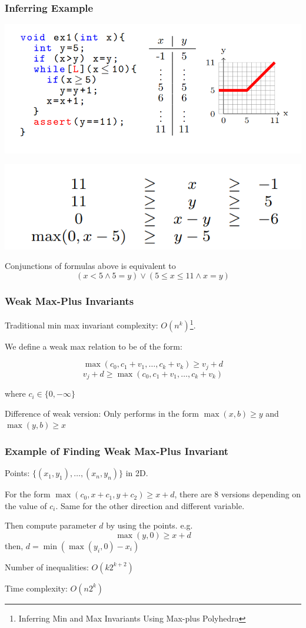 \documentclass[11pt]{beamer}
\begin{document}
\begin{frame}\frametitle{Inferring Example}
\includegraphics[scale=0.24]{1.png}
\begin{center}
\includegraphics[scale=0.34]{4.png}
\end{center}
Conjunctions of formulas above is equivalent to 
\[(x < 5 \wedge 5 = y) \vee (5 \le x \le 11 \wedge x = y)\]
\end{frame}


\begin{frame}\frametitle{Weak Max-Plus Invariants}
Traditional min max invariant complexity: $O(n^k)$\footnote{Inferring Min and Max Invariants Using Max-plus Polyhedra}.

We define a weak max relation to be of the form: 

\[\max(c_0, c_1 + v_1, \ldots, c_k + v_k) \ge v_j + d\]
\[v_j + d \ge \max(c_0,c_1 + v_1, \ldots, c_k + v_k)\]

where $c_i \in \{0, -\infty\}$

Difference of weak version: 
Only  performs in the form $\max(x, b) \ge y$ and $\max(y, b)\ge x$


\end{frame}

\begin{frame}\frametitle{Example of Finding Weak Max-Plus Invariant}
Points: $\{(x_1, y_1), \ldots, (x_n, y_n)\}$ in 2D. 

For the form $\max(c_0, x + c_1, y + c_2) \ge x + d$, there are 8 versions depending on the value of $c_i$. Same for the other direction and different variable. 

Then compute parameter $d$ by using the points. e.g.
\[\max(y,0)\ge x + d\]
then, $d = \min(\max(y_i, 0) - x_i)$

Number of inequalities: $O(k2^{k+2})$

Time complexity: $O(n2^k)$




\end{frame}
\end{document}
